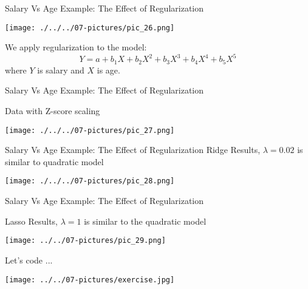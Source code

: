 \documentclass[11pt]{beamer}
\begin{document}
\begin{frame}{Salary Vs Age Example: The Effect of Regularization}
	\begin{center}
	\texttt{[image: ./../../07-pictures/pic\_26.png]}
	\end{center}
We apply regularization to the model:
\begin{equation}
Y = a + b_1X + b_2X^2 + b_3X^3 + b_4X^4 + b_5 X^5
\end{equation}
where $Y$ is salary and $X$ is age.
\end{frame}
\begin{frame}{Salary Vs Age Example: The Effect of Regularization}

Data with Z-score scaling
	\begin{center}
	\texttt{[image: ./../../07-pictures/pic\_27.png]}
	\end{center}
\end{frame}
\begin{frame}{Salary Vs Age Example: The Effect of Regularization}
Ridge Results, $\lambda=0.02$ is similar to quadratic model
	\begin{center}
	\texttt{[image: ./../../07-pictures/pic\_28.png]}
	\end{center}
\end{frame}
\begin{frame}{Salary Vs Age Example: The Effect of Regularization}

Lasso Results, $\lambda=1$ is similar to the quadratic model

	\begin{center}
	\texttt{[image: ../../07-pictures/pic\_29.png]}
	\end{center}
\end{frame}
\begin{frame}{Let's code ...}
\begin{center}
\texttt{[image: ../../07-pictures/exercise.jpg]} 
\end{center}
\end{frame}
\end{document}
